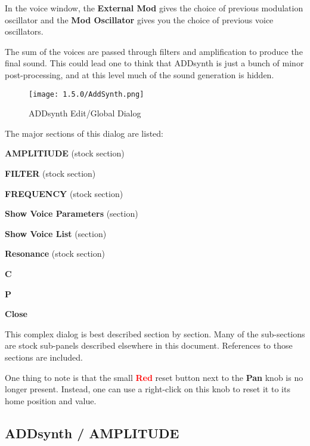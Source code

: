    In the voice window, the \textbf{External Mod} gives the choice of previous
   modulation oscillator and the \textbf{Mod Oscillator} gives you the choice of
   previous voice oscillators.

   The sum of the voices are passed through filters and amplification to
   produce the final sound. This could lead one to think that ADDsynth is just
   a bunch of minor post-processing, and at this level much of the sound
   generation is hidden.

\begin{figure}[H]
   \centering 
   \texttt{[image: 1.5.0/AddSynth.png]}
   \caption{ADDsynth Edit/Global Dialog}
   \label{fig:addsynth_edit_dialog}
\end{figure}

   The major sections of this dialog are listed:

   \begin{enumber}
      \item \textbf{AMPLITIUDE} (stock section)
      \item \textbf{FILTER} (stock section)
      \item \textbf{FREQUENCY} (stock section)
      \item \textbf{Show Voice Parameters} (section)
      \item \textbf{Show Voice List} (section)
      \item \textbf{Resonance} (stock section)
      \item \textbf{C}
      \item \textbf{P}
      \item \textbf{Close}
   \end{enumber}

   This complex dialog is best described section by section.
   Many of the sub-sections are stock sub-panels described elsewhere
   in this document.  References to those sections are included.

   One thing to note is that the small \textbf{\textcolor{red}{Red}}
   reset button next to the \textbf{Pan} knob is no longer present.  Instead,
   one can use a right-click on this knob to reset it to its home position and
   value.

\subsection{ADDsynth / AMPLITUDE}
\label{subsec:addsynth_amplitude}

